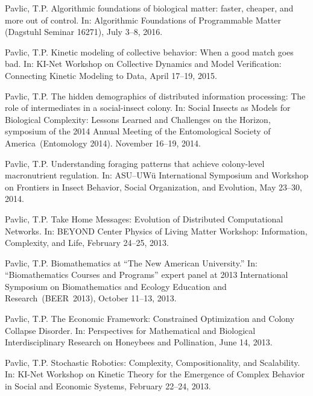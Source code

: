 \documentclass[10pt]{article}
\renewcommand\emph[1]{#1}
\begin{document}
\begin{bibenum}

    \item Pavlic, T.P. Algorithmic foundations of biological matter:
        faster, cheaper, and more out of control. In: \emph{Algorithmic
        Foundations of Programmable Matter (Dagstuhl Seminar 16271)},
        July 3--8, 2016.

    \item Pavlic, T.P. Kinetic modeling of collective behavior: When a
        good match goes bad. In: \emph{KI-Net Workshop on Collective
        Dynamics and Model Verification: Connecting Kinetic Modeling to
        Data}, April 17--19, 2015.

    \item Pavlic, T.P.
        The hidden demographics of distributed information processing:
        The role of intermediates in a social-insect colony. In:
        \emph{Social Insects as Models for Biological Complexity:
        Lessons Learned and Challenges on the Horizon}, symposium of the
        2014 Annual Meeting of the Entomological Society of
        America~(Entomology 2014). November 16--19, 2014.

    \item Pavlic, T.P. Understanding foraging patterns that achieve
        colony-level macronutrient regulation. In: \emph{ASU--UW\"{u}
        International Symposium and Workshop on Frontiers in Insect
        Behavior, Social Organization, and Evolution}, May 23--30, 2014.

    \item Pavlic, T.P. Take Home Messages: Evolution of Distributed
        Computational Networks. In: \emph{BEYOND Center Physics of
        Living Matter Workshop: Information, Complexity, and Life},
        February 24--25, 2013.

    \item Pavlic, T.P. Biomathematics at ``The New American
        University.'' In: ``Biomathematics Courses and Programs'' expert
        panel at 2013 International Symposium on Biomathematics and
        Ecology Education and Research~(BEER~2013),
        October 11--13, 2013.

    \item Pavlic, T.P. The Economic Framework: Constrained Optimization
        and Colony Collapse Disorder. In: \emph{Perspectives for
        Mathematical and Biological Interdisciplinary Research on
        Honeybees and Pollination}, June 14, 2013.

    \item Pavlic, T.P. Stochastic Robotics: Complexity,
        Compositionality, and Scalability. In: \emph{KI-Net Workshop on
        Kinetic Theory for the Emergence of Complex Behavior in Social
        and Economic Systems}, February 22--24, 2013.

\end{bibenum}
\end{document}
